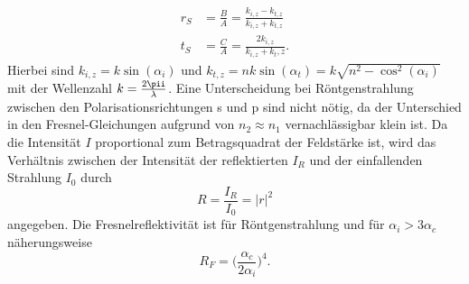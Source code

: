 \begin{align}
  r_S&=\frac{B}{A}=\frac{k_{i,z}-k_{t,z}}{k_{i,z}+k_{t,z}}\\
  t_S&=\frac{C}{A}=\frac{2k_{i,z}}{k_{i,z}+k_t,z}.
\end{align}
Hierbei sind $k_{i,z}=k\sin(\alpha_i)$ und $k_{t,z}=nk\sin(\alpha_t)=k\sqrt{n^2-\cos^2(\alpha_i)}$ mit der Wellenzahl $k=\frac{2\pii}{\lambda}$. Eine Unterscheidung bei Röntgenstrahlung zwischen den Polarisationsrichtungen s und p sind nicht nötig, da der Unterschied in den Fresnel-Gleichungen aufgrund von $n_2\approx n_1$ vernachlässigbar klein ist.
Da die Intensität $I$ proportional zum Betragsquadrat der Feldstärke ist, wird das Verhältnis zwischen der Intensität der reflektierten $I_R$ und der einfallenden Strahlung $I_0$ durch
\begin{equation}
  R=\frac{I_R}{I_0}=|r|^2
\end{equation}
angegeben. Die Fresnelreflektivität ist für Röntgenstrahlung und für $\alpha_i>3\alpha_c$ näherungsweise
\begin{equation}
  R_F=\bigl(\frac{\alpha_c}{2\alpha_i}\bigr)^4.
\end{equation}
